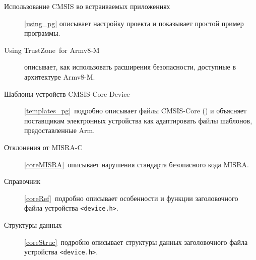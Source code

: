 \begin{description}
\item[Использование CMSIS во встраиваемых приложениях] \ref{using_pg} 
описывает настройку проекта и показывает простой пример программы.

\item[Using TrustZone\rcirc\ for Armv8-M] описывает, как использовать расширения
безопасности, доступные в архитектуре Armv8-M.

\item[Шаблоны устройств CMSIS-Core Device] \ref{templates_pg}\ подробно
описывает файлы CMSIS-Core (\cm{}) и объясняет поставщикам электронных
устройства как адаптировать файлы шаблонов, предоставленные Arm.

\item[Отклонения от MISRA-C] \ref{coreMISRA}\ описывает нарушения стандарта
безопасного кода MISRA.

\item[Справочник] \ref{coreRef}\ подробно описывает особенности и функции
заголовочного файла устройства \verb|<device.h>|.

\item[Структуры данных] \ref{coreStruc}\ подробно описывает структуры данных
заголовочного файла устройства \verb|<device.h>|.

\end{description}